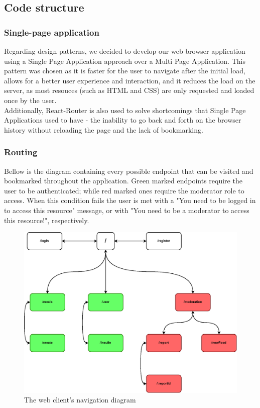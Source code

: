 \subsection{Code structure}

\subsubsection{Single-page application}

Regarding design patterns, we decided to develop our web browser application using a Single Page Application approach over
a Multi Page Application. This pattern was chosen as it is faster for the user to navigate after the initial load, allows for
a better user experience and interaction, and it reduces the load on the server, as most resouces (such as HTML and CSS) are
only requested and loaded once by the user.\\

Additionally, React-Router is also used to solve shortcomings that Single Page Applications used to have -
the inability to go back and forth on the browser history without reloading the page and the lack of bookmarking.\\

\subsubsection{Routing}
Bellow is the diagram containing every possible endpoint that can be visited and bookmarked
throughout the application. Green marked endpoints require the user to be authenticated; while red marked ones
require the moderator role to access. When this condition fails the user is met with a "You need to be logged
in to access this resource" message, or with "You need to be a moderator to access this resource!", respectively.

\begin{figure}[H]
    \begin{center}
        \includegraphics[scale=0.7]{_figures/web-client-endpoints.eps}
        \caption{The web client's navigation diagram}
    \end{center}
\end{figure}

